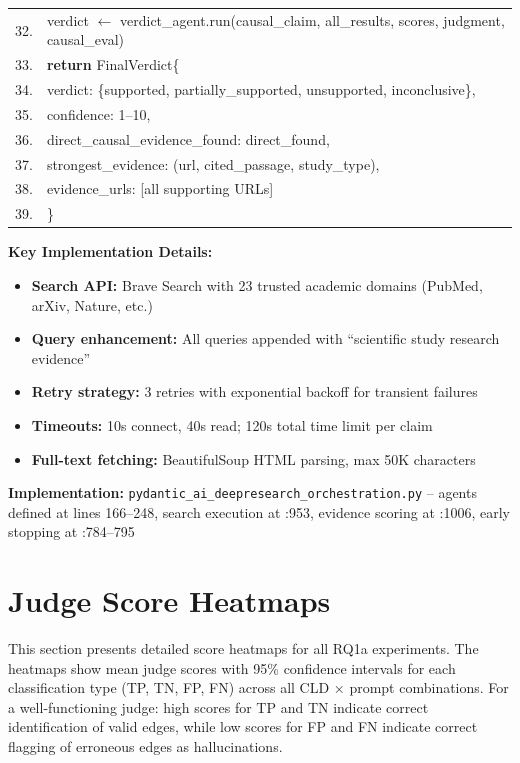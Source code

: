 \begin{table}[H]
\begin{tabular}{@{}r l@{}}
32. & verdict $\leftarrow$ verdict\_agent.run(causal\_claim, all\_results, scores, judgment, causal\_eval) \\
33. & \textbf{return} FinalVerdict\{ \\
34. & \quad verdict: \{supported, partially\_supported, unsupported, inconclusive\}, \\
35. & \quad confidence: 1--10, \\
36. & \quad direct\_causal\_evidence\_found: direct\_found, \\
37. & \quad strongest\_evidence: (url, cited\_passage, study\_type), \\
38. & \quad evidence\_urls: [all supporting URLs] \\
39. & \} \\
\bottomrule
\end{tabular}
\end{table}

\textbf{Key Implementation Details:}
\begin{itemize}[noitemsep]
    \item \textbf{Search API:} Brave Search with 23 trusted academic domains (PubMed, arXiv, Nature, etc.)
    \item \textbf{Query enhancement:} All queries appended with ``scientific study research evidence''
    \item \textbf{Retry strategy:} 3 retries with exponential backoff for transient failures
    \item \textbf{Timeouts:} 10s connect, 40s read; 120s total time limit per claim
    \item \textbf{Full-text fetching:} BeautifulSoup HTML parsing, max 50K characters
\end{itemize}

\textbf{Implementation:} \texttt{pydantic\_ai\_deepresearch\_orchestration.py} -- agents defined at lines 166--248, search execution at :953, evidence scoring at :1006, early stopping at :784--795


\section{Judge Score Heatmaps}
\label{sec:appendix_judge_heatmaps}

This section presents detailed score heatmaps for all RQ1a experiments. The heatmaps show mean judge scores with 95\% confidence intervals for each classification type (TP, TN, FP, FN) across all CLD × prompt combinations. For a well-functioning judge: high scores for TP and TN indicate correct identification of valid edges, while low scores for FP and FN indicate correct flagging of erroneous edges as hallucinations.

